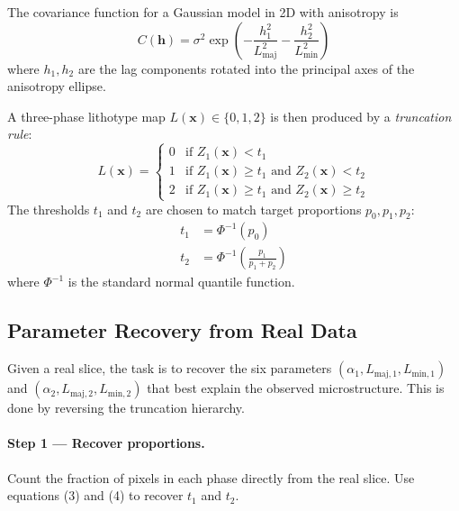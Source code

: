 \documentclass[11pt, a4paper]{article}
\begin{document}
The covariance function for a Gaussian model in 2D with anisotropy is
\begin{equation}
    C(\mathbf{h}) = \sigma^2 \exp\!\left(-\frac{h_1^2}{L_{\text{maj}}^2} - \frac{h_2^2}{L_{\text{min}}^2}\right)
\end{equation}
where $h_1, h_2$ are the lag components rotated into the principal axes of the anisotropy ellipse.

A three-phase lithotype map $L(\mathbf{x}) \in \{0, 1, 2\}$ is then produced by a \emph{truncation rule}:
\begin{equation}
    L(\mathbf{x}) = \begin{cases}
        0 & \text{if } Z_1(\mathbf{x}) < t_1 \\
        1 & \text{if } Z_1(\mathbf{x}) \geq t_1 \text{ and } Z_2(\mathbf{x}) < t_2 \\
        2 & \text{if } Z_1(\mathbf{x}) \geq t_1 \text{ and } Z_2(\mathbf{x}) \geq t_2
    \end{cases}
\end{equation}
The thresholds $t_1$ and $t_2$ are chosen to match target proportions $p_0, p_1, p_2$:
\begin{align}
    t_1 &= \Phi^{-1}(p_0) \\
    t_2 &= \Phi^{-1}\!\left(\frac{p_1}{p_1 + p_2}\right)
\end{align}
where $\Phi^{-1}$ is the standard normal quantile function.

\subsection{Parameter Recovery from Real Data}

Given a real slice, the task is to recover the six parameters $(\alpha_1, L_{\text{maj},1}, L_{\text{min},1})$ and $(\alpha_2, L_{\text{maj},2}, L_{\text{min},2})$ that best explain the observed microstructure. This is done by reversing the truncation hierarchy.

\paragraph{Step 1 --- Recover proportions.}
Count the fraction of pixels in each phase directly from the real slice. Use equations (3) and (4) to recover $t_1$ and $t_2$.
\end{document}
